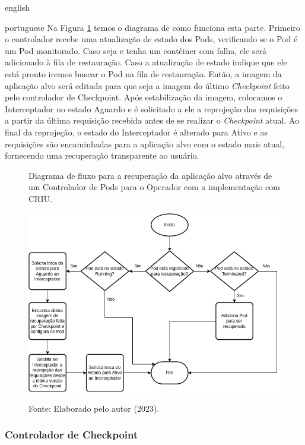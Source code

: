 \begin{otherlanguage*}{english}
\begin{otherlanguage*}{portuguese}
Na Figura \ref{fig:restore-pod} temos o diagrama de como funciona esta parte. Primeiro o
controlador recebe uma atualização de estado dos Pods, verificando se o Pod é um Pod monitorado.
Caso seja e tenha um contêiner com falha, ele será adicionado à fila de restauração. Caso a
atualização de estado indique que ele está pronto iremos buscar o Pod na fila de restauração.
Então, a imagem da aplicação alvo será editada para que seja a imagem do último \textit{Checkpoint}
feito pelo controlador de Checkpoint. Após estabilização da imagem, colocamos o Interceptador no
estado Aguardo e é solicitado a ele a reprojeção das requisições a partir da última requisição
recebida antes de se realizar o \textit{Checkpoint} atual. Ao final da reprojeção, o estado do
Interceptador é alterado para Ativo e as requisições são encaminhadas para a aplicação alvo
com o estado mais atual, fornecendo uma recuperação transparente ao usuário.

\begin{figure}[h!]
\centering
\caption{Diagrama de fluxo para a recuperação da aplicação alvo através de um Controlador de Pods para o Operador com a implementação com CRIU.}
\includegraphics[scale=0.64]{images/restore-pod-criu.png}
\label{fig:restore-pod}
\caption{Fonte: Elaborado pelo autor (2023).}
\end{figure}

\subsubsection{Controlador de Checkpoint}


\end{otherlanguage*}
\end{otherlanguage*}
